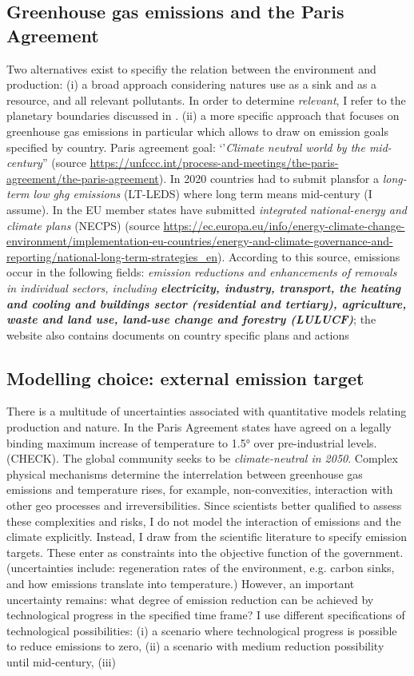 \subsection{Greenhouse gas emissions and the Paris Agreement}

Two alternatives exist to specifiy the relation between the environment and production: (i) a broad approach considering natures use as a sink and as a resource, and all relevant pollutants. 
In order to determine \textit{relevant}, I refer to the planetary boundaries discussed in \cite{Rockstrom2009AHumanity}. (ii) a more specific approach that focuses on greenhouse gas emissions in particular which allows to draw on emission goals specified by country. Paris agreement goal: `'\textit{Climate neutral world by the mid-century}'' (source \url{https://unfccc.int/process-and-meetings/the-paris-agreement/the-paris-agreement}). In 2020 countries had to submit plansfor a \textit{long-term low ghg emissions} (LT-LEDS) where long term means mid-century (I assume). In the EU member states have submitted \textit{integrated national-energy and climate plans} (NECPS) (source \url{https://ec.europa.eu/info/energy-climate-change-environment/implementation-eu-countries/energy-and-climate-governance-and-reporting/national-long-term-strategies_en}). According to this source, emissions occur in the following fields: 
\textit{emission reductions and enhancements of removals in individual sectors, including \textbf{electricity, industry, transport, the heating and cooling and buildings sector (residential and tertiary), agriculture, waste and land use, land-use change and forestry (LULUCF)}}; the website also contains documents on country specific plans and actions

\subsection{Modelling choice: external emission target}
There is a multitude of uncertainties associated with quantitative models relating production and nature. 
In the Paris Agreement states have agreed on a legally binding maximum increase of temperature to 1.5° over pre-industrial levels. (CHECK). The global community seeks to be \textit{climate-neutral in 2050}. Complex physical mechanisms determine the interrelation between greenhouse gas emissions and temperature rises, for example, non-convexities, interaction with other geo processes and irreversibilities. 
Since scientists better qualified to assess these complexities and risks, I do not model the interaction of emissions and the climate explicitly. Instead, I draw from the scientific literature to specify emission targets. These enter as constraints into the objective function of the government. (uncertainties include: regeneration rates of the environment, e.g. carbon sinks, and how emissions translate into temperature.)
However, an important uncertainty remains: what degree of emission reduction can be achieved by technological progress in the specified time frame? I use different specifications of technological possibilities: (i) a scenario where technological progress is possible to reduce emissions to zero, (ii) a scenario with medium reduction possibility until mid-century, (iii)